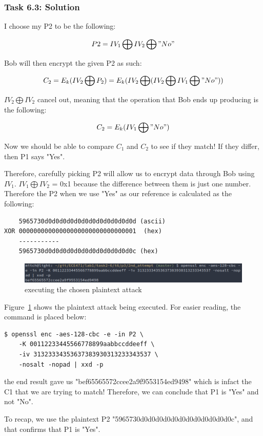 \documentclass[12pt]{article}
\begin{document}
\clearpage
\subsubsection{Task 6.3: Solution}

I choose my P2 to be the following:

\[ P2 = IV_1 \bigoplus IV_2 \bigoplus "No" \]

Bob will then encrypt the given P2 as such:

\[ C_2 = E_{k} (IV_2 \bigoplus P_2 ) = E_{k} (IV_2\bigoplus (IV_2\bigoplus IV_1 \bigoplus "No")) \]

$IV_2 \bigoplus IV_2$ cancel out, meaning that the operation that Bob ends up producing is the following:

\[ C_2 = E_k (IV_1 \bigoplus "No") \]

Now we should be able to compare $C_1$ and $C_2$ to see if they match! If they differ, then P1 says "Yes".

Therefore, carefully picking P2 will allow us to encrypt data through Bob using $IV_1$. $IV_1 \bigoplus IV_2$ = 0x1 because the difference between them is just one number. Therefore the P2 when we use "Yes" as our reference is calculated as the following:

\begin{verbatim}
    5965730d0d0d0d0d0d0d0d0d0d0d0d0d (ascii)
XOR 00000000000000000000000000000001  (hex)
    -----------
    5965730d0d0d0d0d0d0d0d0d0d0d0d0c (hex)
\end{verbatim}

\begin{figure}[H]
    \begin{center}
        \includegraphics[scale=0.55]{t6p3.png}
    \end{center}{}
    \caption{executing the chosen plaintext attack}
    \label{fig:t6p3}
\end{figure}

Figure~\ref{fig:t6p3} shows the plaintext attack being executed. For easier reading, the command is placed below:

\begin{verbatim}
$ openssl enc -aes-128-cbc -e -in P2 \
    -K 00112233445566778899aabbccddeeff \
    -iv 31323334353637383930313233343537 \
    -nosalt -nopad | xxd -p
\end{verbatim}

the end result gave us "bef65565572ccee2a9f9553154ed9498" which is infact the C1 that we are trying to match! Therefore, we can conclude that P1 is "Yes" and not "No".

To recap, we use the plaintext P2 "5965730d0d0d0d0d0d0d0d0d0d0d0d0c", and that confirms that P1 is "Yes".
\end{document}
